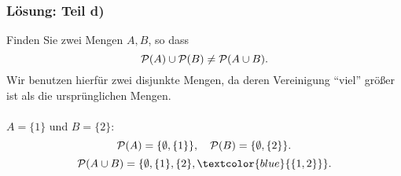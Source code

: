 %
\begin{frame}\frametitle{Lösung: Teil d)}
Finden Sie zwei Mengen $A,B$, so dass
			$$
				{\cal P}(A) \cup {\cal P}(B) \neq {\cal P}(A\cup B).
			$$\pause
Wir benutzen hierfür zwei disjunkte Mengen, da deren Vereinigung ``viel'' größer ist als die ursprünglichen Mengen.\\
\quad\\
\pause
$A=\{1\}$ und $B=\{2\}$:\pause 
			$$
				{\cal P}(A) = \{\emptyset, \{1\} \}, \quad {\cal P}(B) = \{\emptyset, \{2\} \}.
			$$\pause
			$$
				{\cal P}(A\cup B) = \{\emptyset, \{1\}, \{2\}, \textcolor{blue}{\{1,2\}} \}.
			$$
\end{frame}
%
